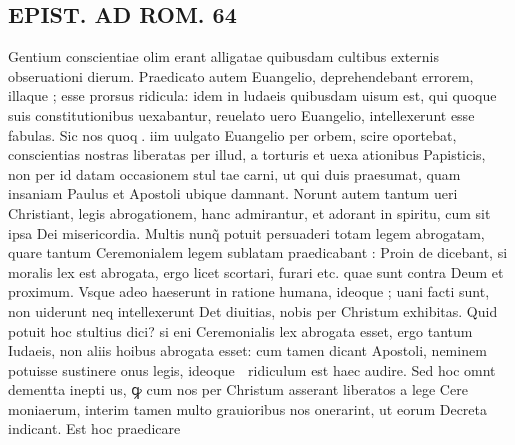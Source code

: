 \documentclass{article}
\begin{document}
\begin{pages}
\section*{EPIST. AD ROM.  64 }
\marginpar{[ p.]}\pstart Gentium conscientiae olim erant alligatae quibusdam cultibus externis obseruationi dierum. Praedicato autem Euangelio, deprehendebant errorem, illaque ; esse prorsus ridicula: idem in ludaeis quibusdam uisum est, qui quoque suis constitutionibus uexabantur, reuelato uero Euangelio, intellexerunt esse fabulas. Sic nos quoq.  iim uulgato Euangelio per orbem, scire oportebat, conscientias nostras liberatas per illud, a torturis et uexa ationibus Papisticis, non per id datam occasionem stul tae carni, ut qui duis praesumat, quam insaniam Paulus et Apostoli ubique damnant. Norunt autem tantum ueri Christiant, legis abrogationem, hanc admirantur, et adorant in spiritu, cum sit ipsa Dei misericordia. Multis nunq̃ potuit persuaderi totam legem abrogatam, quare tantum Ceremonialem legem sublatam praedicabant : Proin de dicebant, si moralis lex est abrogata, ergo licet scortari, furari etc. quae sunt contra Deum et proximum.  Vsque adeo haeserunt in ratione humana, ideoque ; uani facti sunt, non uiderunt neq intellexerunt Det diuitias, nobis per Christum exhibitas. Quid potuit hoc stultius dici? si eni Ceremonialis lex abrogata esset, ergo tantum Iudaeis, non aliis hoibus abrogata esset: cum tamen dicant Apostoli, neminem potuisse sustinere onus legis, ideoque  ridiculum est haec audire. Sed hoc omnt dementta inepti us, ꝙ cum nos per Christum asserant liberatos a lege Cere moniaerum, interim tamen multo grauioribus nos onerarint, ut eorum Decreta indicant. Est hoc praedicare  \pend

\end{pages}
\end{document}
